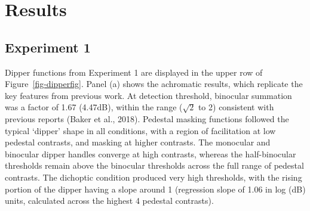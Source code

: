 \documentclass[
  letterpaper,
  DIV=11,
  numbers=noendperiod]{scrartcl}
\begin{document}
\hypertarget{results}{%
\section{Results}\label{results}}

\hypertarget{experiment-1}{%
\subsection{Experiment 1}\label{experiment-1}}

Dipper functions from Experiment 1 are displayed in the upper row of
Figure~\ref{fig-dipperfig}. Panel (a) shows the achromatic results,
which replicate the key features from previous work. At detection
threshold, binocular summation was a factor of 1.67 (4.47dB), within the
range (\(\sqrt{2}\) to 2) consistent with previous reports (Baker et
al., 2018). Pedestal masking functions followed the typical `dipper'
shape in all conditions, with a region of facilitation at low pedestal
contrasts, and masking at higher contrasts. The monocular and binocular
dipper handles converge at high contrasts, whereas the half-binocular
thresholds remain above the binocular thresholds across the full range
of pedestal contrasts. The dichoptic condition produced very high
thresholds, with the rising portion of the dipper having a slope around
1 (regression slope of 1.06 in log (dB) units, calculated across the
highest 4 pedestal contrasts).
\end{document}
